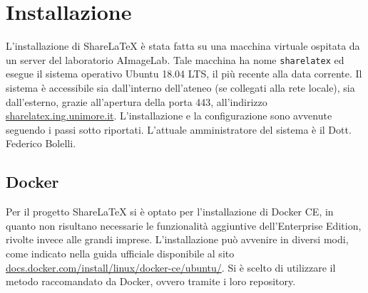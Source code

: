 \chapter{Installazione}
\label{Installazione}
\thispagestyle{empty}

L'installazione di ShareLaTeX è stata fatta su una macchina virtuale ospitata da un server del laboratorio AImageLab. Tale macchina ha nome \verb|sharelatex| ed esegue il sistema operativo Ubuntu 18.04 LTS, il più recente alla data corrente. Il sistema è accessibile sia dall'interno dell'ateneo (se collegati alla rete locale), sia dall'esterno, grazie all'apertura della porta 443, all'indirizzo \url{sharelatex.ing.unimore.it}. L'installazione e la configurazione sono avvenute seguendo i passi sotto riportati. L'attuale amministratore del sistema è il Dott. Federico Bolelli.

\section{Docker}
Per il progetto ShareLaTeX si è optato per l'installazione di Docker CE, in quanto non risultano necessarie le funzionalità aggiuntive dell'Enterprise Edition, rivolte invece alle grandi imprese. L'installazione può avvenire in diversi modi, come indicato nella guida ufficiale disponibile al sito \url{docs.docker.com/install/linux/docker-ce/ubuntu/}. Si è scelto di utilizzare il metodo raccomandato da Docker, ovvero tramite i loro repository.

